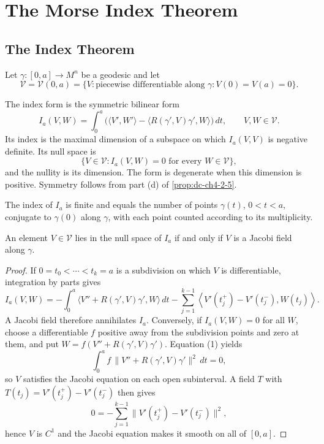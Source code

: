 \chapter{The Morse Index Theorem}
\label{chap:dc-morse-index-theorem}

\section{The Index Theorem}

Let $\gamma:[0,a]\to M^n$ be a geodesic and let
\[
  \mathcal V=\mathcal V(0,a)=\{V:\text{piecewise differentiable along }\gamma:
  V(0)=V(a)=0\}.
\]

\begin{definition}
  \label{def:dc-ch11-2-1}
  The index form is the symmetric bilinear form
  \[
  I_a(V,W)=\int_0^a\bigl(\langle V',W'\rangle-
  \langle R(\gamma',V)\gamma',W\rangle\bigr)\,dt,
  \qquad V,W\in\mathcal V.
  \]
  Its index is the maximal dimension of a subspace on which $I_a(V,V)$ is
  negative definite. Its null space is
  \[
  \{V\in\mathcal V:I_a(V,W)=0\text{ for every }W\in\mathcal V\},
  \]
  and the nullity is its dimension. The form is degenerate when this dimension
  is positive. Symmetry follows from part (d) of \cref{prop:dc-ch4-2-5}.
\end{definition}

\begin{theorem}
  \label{thm:dc-ch11-2-2}
  The index of $I_a$ is finite and equals the number of points $\gamma(t)$,
  $0<t<a$, conjugate to $\gamma(0)$ along $\gamma$, with each point counted
  according to its multiplicity.
\end{theorem}

\begin{proposition}
  \label{prop:dc-ch11-2-3}
  An element $V\in\mathcal V$ lies in the null space of $I_a$ if and only if
  $V$ is a Jacobi field along $\gamma$.
\end{proposition}
\begin{proof}
  \sketch
  If $0=t_0<\cdots<t_k=a$ is a subdivision on which $V$ is differentiable, integration
  by parts gives
  \[
  I_a(V,W)=-\int_0^a\langle V''+R(\gamma',V)\gamma',W\rangle\,dt
  -\sum_{j=1}^{k-1}\left\langle V'(t_j^+)-V'(t_j^-),W(t_j)\right\rangle.\tag{1}
  \]
  A Jacobi field therefore annihilates $I_a$. Conversely, if $I_a(V,W)=0$ for all
  $W$, choose a differentiable $f$ positive away from the subdivision points and
  zero at them, and put $W=f(V''+R(\gamma',V)\gamma')$. Equation (1) yields
  \[
  \int_0^a f\,\lVert V''+R(\gamma',V)\gamma'\rVert^2\,dt=0,
  \]
  so $V$ satisfies the Jacobi equation on each open subinterval. A field $T$ with
  $T(t_j)=V'(t_j^+)-V'(t_j^-)$ then gives
  \[
  0=-\sum_{j=1}^{k-1}\lVert V'(t_j^+)-V'(t_j^-)\rVert^2,
  \]
  hence $V$ is $C^1$ and the Jacobi equation makes it smooth on all of $[0,a]$.
\end{proof}

